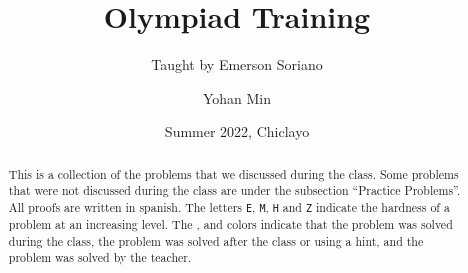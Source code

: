 \documentclass[11pt]{scrartcl}
\title{Olympiad Training}
\subtitle{Taught by Emerson Soriano}
\author{Yohan Min}
\date{Summer 2022, Chiclayo}
\begin{document}
\maketitle

\begin{abstract}
	This is a collection of the problems that we discussed during the class. Some problems that were not discussed during the class are under the subsection ``Practice Problems''. All proofs are written in spanish. The letters \verb|E|, \verb|M|, \verb|H| and \verb|Z| indicate the hardness of a problem at an increasing level. The ,  and  colors indicate that the problem was solved during the class, the problem was solved after the class or using a hint, and the problem was solved by the teacher.
\end{abstract}

\tableofcontents





\end{document}
